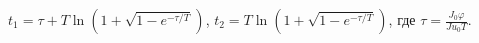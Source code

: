 $t_1 = \tau + T \ln{(1 + \sqrt{1 - e^{-\tau / T}})}$,
$t_2 = T\ln{(1 + \sqrt{1 - e^{-\tau / T}})}$,
где $\tau = \frac{J_0 \varphi}{Ju_0T}$.
